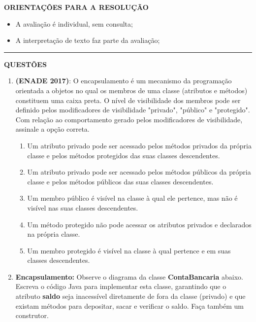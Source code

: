 \documentclass[12pt,a4paper]{article}
\begin{document}
\textbf{ORIENTAÇÕES PARA A RESOLUÇÃO}  

\begin{itemize}
    \item A avaliação é individual, sem consulta;
    \item A interpretação de texto faz parte da avaliação;
\end{itemize}

\vspace{0.5cm}

\begin{center}
    \rule{\textwidth}{0.4pt}
    \textbf{QUESTÕES}
\end{center}

\vspace{0.5cm} 

\begin{enumerate}
    \item \textbf{(ENADE 2017)}: O encapsulamento é um mecanismo da programação orientada a objetos no qual os membros de uma classe (atributos e métodos) constituem uma caixa preta. O nível de visibilidade dos membros pode ser definido pelos modificadores de visibilidade "privado", "público" e "protegido". Com relação ao comportamento gerado pelos modificadores de visibilidade, assinale a opção correta. 
    \begin{enumerate}[label=\Alph*)]
        \item Um atributo privado pode ser acessado pelos métodos privados da própria classe e pelos métodos protegidos das suas classes descendentes.
        \item Um atributo privado pode ser acessado pelos métodos públicos da própria classe e pelos métodos públicos das suas classes descendentes.
        \item Um membro público é visível na classe à qual ele pertence, mas não é visível nas suas classes descendentes.
        \item Um método protegido não pode acessar os atributos privados e declarados na própria classe.
        \item Um membro protegido é visível na classe à qual pertence e em suas classes descendentes.
    \end{enumerate}

    \item \textbf{Encapsulamento:} Observe o diagrama da classe \textbf{ContaBancaria} abaixo. Escreva o código Java para implementar esta classe, garantindo que o atributo \textbf{saldo} seja inacessível diretamente de fora da classe (privado) e que existam métodos para depositar, sacar e verificar o saldo. Faça também um construtor.


\end{enumerate}
\end{document}
